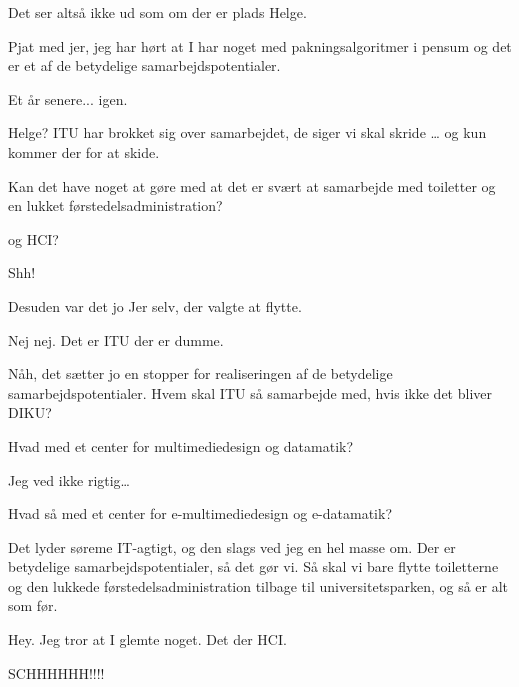 \documentclass[a4paper,11pt]{article}
\begin{document}
\begin{sketch}

 Det ser altså ikke ud som om der er plads Helge.

 Pjat med jer, jeg har hørt at I har noget med pakningsalgoritmer i pensum og det er et af de betydelige samarbejdspotentialer.


 Et år senere... igen.

 Helge? ITU har brokket sig over samarbejdet, de siger vi skal skride \ldots{} og kun kommer der for at 
skide.

 Kan det have noget at gøre med at det er svært at samarbejde med toiletter og en lukket førstedelsadministration?

 og HCI?

 Shh!

 Desuden var det jo Jer selv, der valgte at flytte.

 Nej nej. Det er ITU der er dumme.

 Nåh, det sætter jo en stopper for realiseringen af de betydelige samarbejdspotentialer. Hvem skal ITU så samarbejde med, hvis ikke det bliver DIKU?

 Hvad med et center for multimediedesign og datamatik?

 Jeg ved ikke rigtig\ldots

 Hvad så med et center for e-multimediedesign og e-datamatik?

 Det lyder søreme IT-agtigt, og den slags ved jeg en hel masse om. Der er betydelige samarbejdspotentialer, så det gør vi. Så skal vi bare flytte toiletterne og den lukkede førstedelsadministration tilbage til universitetsparken, og så er alt som før.



 Hey. Jeg tror at I glemte noget. Det der HCI.

 SCHHHHHH!!!!


\end{sketch}
\end{document}
